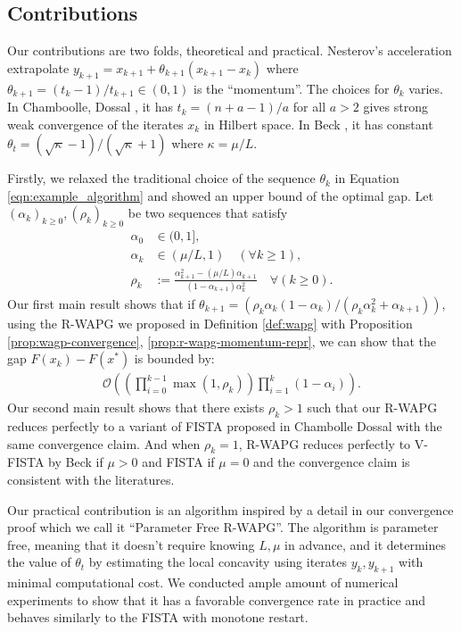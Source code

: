 \documentclass[12pt]{article}
\begin{document}
    \subsection{Contributions}
        Our contributions are two folds, theoretical and practical. 
        Nesterov's acceleration extrapolate $y_{k + 1} = x_{k + 1} + \theta_{k + 1}(x_{k + 1} - x_k)$ where $\theta_{k + 1} = (t_{k} - 1)/t_{k + 1} \in (0, 1)$ is the ``momentum''. 
        The choices for $\theta_k$ varies. 
        In Chamboolle, Dossal \cite{chambolle_convergence_2015}, it has $t_k = (n + a - 1)/a$ for all $a > 2$ gives strong weak convergence of the iterates $x_k$ in Hilbert space. 
        In Beck \cite{beck_first-order_2017}, it has constant $\theta_t = (\sqrt{\kappa} - 1)/(\sqrt{\kappa} + 1)$ where $\kappa = \mu/L$. 
        \par
        Firstly, we relaxed the traditional choice of the sequence $\theta_k$ in Equation \ref{eqn:example_algorithm} and showed an upper bound of the optimal gap. 
        Let $(\alpha_k)_{k \ge0}, (\rho_k)_{k \ge 0}$ be two sequences that satisfy
        \begin{align*}
            \alpha_0 &\in (0, 1], 
            \\
            \alpha_k &\in (\mu/L, 1) \quad (\forall k \ge 1), 
            \\
            \rho_k &:= \frac{\alpha_{k + 1}^2 - (\mu/L)\alpha_{k + 1}}{(1 - \alpha_{k + 1})\alpha_k^2} \quad \forall (k \ge 0). 
        \end{align*}
        Our first main result shows that if $\theta_{k + 1} = (\rho_k\alpha_k(1 - \alpha_k)/(\rho_k\alpha_k^2 + \alpha_{k + 1}))$, using the R-WAPG we proposed in Definition \ref{def:wapg} with Proposition \ref{prop:wagp-convergence}, \ref{prop:r-wapg-momentum-repr}, we can show that the gap $F(x_k) - F(x^*)$ is bounded by:
        \begin{align*}
            \mathcal O\left(
                \left(
                    \prod_{i = 0}^{k - 1} \max(1, \rho_{k})
                \right)
                \prod_{i = 1}^{k} \left(1  - \alpha_i\right)
            \right). 
        \end{align*}
        Our second main result shows that there exists $\rho_k > 1$ such that our R-WAPG reduces perfectly to a variant of FISTA proposed in Chambolle Dossal \cite{chambolle_convergence_2015} with the same convergence claim. 
        And when $\rho_k = 1$, R-WAPG reduces perfectly to V-FISTA by Beck \cite{beck_first-order_2017} if $\mu > 0$ and FISTA if $\mu = 0$ and the convergence claim is consistent with the literatures. 
        \par
        Our practical contribution is an algorithm inspired by a detail in our convergence proof which we call it ``Parameter Free R-WAPG''. 
        The algorithm is parameter free, meaning that it doesn't require knowing $L, \mu$ in advance, and it determines the value of $\theta_t$ by estimating the local concavity using iterates $y_{k}, y_{k + 1}$ with minimal computational cost. 
        We conducted ample amount of numerical experiments to show that it has a favorable convergence rate in practice and behaves similarly to the FISTA with monotone restart. 
\end{document}
